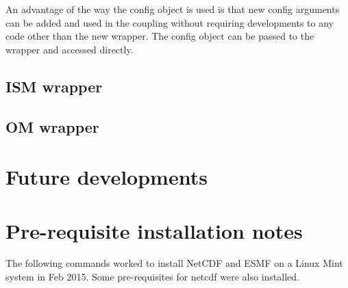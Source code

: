 \documentclass[12pt]{article}
\begin{document}
An advantage of the way the config object is used is that new config arguments can be added and 
used in the coupling without requiring developments to any code other than the new wrapper. 
The config object can be passed to the wrapper and accessed directly. 


\subsection{ISM wrapper}

\subsection{OM wrapper}

\section{Future developments}

\appendix

\section{Pre-requisite installation notes}
\label{app:A}
The following commands worked to install NetCDF and ESMF on a Linux Mint system in Feb 2015.
Some pre-requisites for netcdf were also installed.
\end{document}
